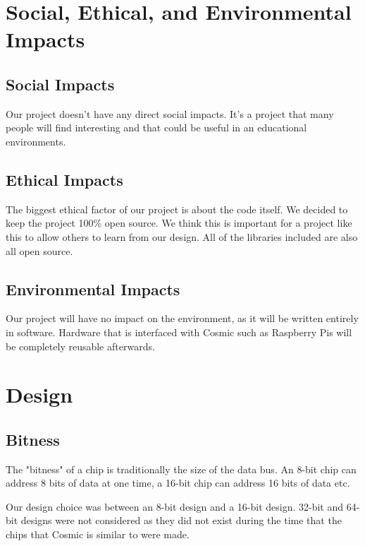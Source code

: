 \documentclass[conference]{IEEEtran}
\begin{document}
\section{Social, Ethical, and Environmental Impacts}

\subsection{Social Impacts}
Our project doesn't have any direct social impacts. It's a project that many people will find interesting and that could be useful in an educational environments.

\subsection{Ethical Impacts}
The biggest ethical factor of our project is about the code itself. We decided to keep the project 100\% open source. We think this is important for a project like this to allow others to learn from our design. All of the libraries included are also all open source.

\subsection{Environmental Impacts}
Our project will have no impact on the environment, as it will be written entirely in software. Hardware that is interfaced with Cosmic such as Raspberry Pis will be completely reusable afterwards.


\section{Design}
\subsection{Bitness}
The "bitness" of a chip is traditionally the size of the data bus. An 8-bit chip can address 8 bits of data at one time, a 16-bit chip can address 16 bits of data etc.

Our design choice was between an 8-bit design and a 16-bit design. 32-bit and 64-bit designs were not considered as they did not exist during the time that the chips that Cosmic is similar to were made.\\

\\
\end{document}

